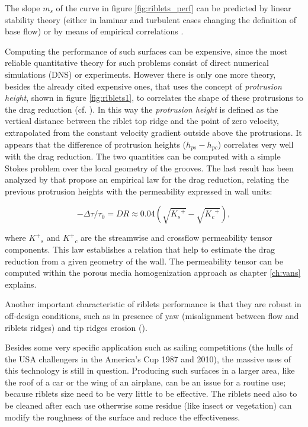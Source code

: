 The slope $m_s$ of the curve in figure \ref{fig:riblets_perf} can be predicted by linear stability theory (either in laminar and turbulent cases changing the definition of base flow) or by means of empirical correlations \citet{garcia2011hydrodynamic}.

Computing the performance of such surfaces can be expensive, since the most reliable quantitative theory for such problems consist of direct numerical simulations (DNS) or experiments.
However there is only one more theory, besides the already cited expensive ones, that uses the concept of \textit{protrusion height}, shown in figure \ref{fig:riblets1}, to correlates the shape of these protrusions to the drag reduction (cf. \citet{luchini1991resistance}).
In this way the \textit{protrusion height} is defined as the vertical distance between the riblet top ridge and the point of zero velocity, extrapolated from the constant velocity gradient outside above the protrusions.
It appears that the difference of protrusion heights ($h_{ps} - h_{pc}$) correlates very well with the drag reduction. The two quantities can be computed with a simple Stokes problem over the local geometry of the grooves.
The last result has been analyzed by \citet{segura2017permeable} that propose an empirical law for the drag reduction, relating the previous protrusion heights with the permeability expressed in wall units:

\begin{equation}
-\Delta \tau/\tau_0 = DR \approx 0.04\left( \sqrt{{K_s}^+} - \sqrt{{K_c}^+} \right),
\label{eq:max_dr}
\end{equation}

where ${K^+}_s$ and ${K^+}_c$ are the streamwise and crossflow permeability tensor components.
This law establishes a relation that help to estimate the drag reduction from a given geometry of the wall. The permeability tensor can be computed within the porous media homogenization approach as chapter \ref{ch:vans} explains.

Another important characteristic of riblets performance is that they are robust in off-design conditions, such as in presence of yaw (misalignment between flow and riblets ridges) and tip ridges erosion (\citet{garcia2011drag}).

Besides some very specific application such as sailing competitions (the hulls of the USA challengers in the America’s Cup 1987 and 2010), the massive uses of this technology is still in question.
Producing such surfaces in a larger area, like the roof of a car or the wing of an airplane, can be an issue for a routine use; because riblets size need to be very little to be effective. The riblets need also to be cleaned after each use otherwise some residue (like insect or vegetation) can modify the roughness of the surface and reduce the effectiveness.

